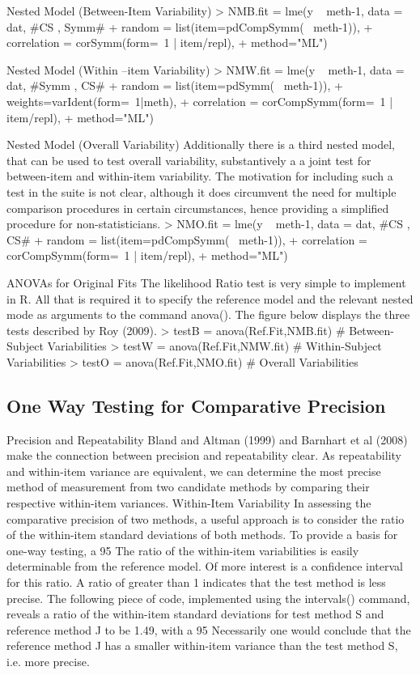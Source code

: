 Nested Model (Between-Item Variability)
> NMB.fit  = lme(y ~ meth-1, data = dat,   #CS , Symm#
+     random = list(item=pdCompSymm(~ meth-1)),
+     correlation = corSymm(form=~1 | item/repl), 
+     method="ML")


Nested Model (Within –item Variability)
> NMW.fit = lme(y ~ meth-1, data = dat,   #Symm , CS# 
+     random = list(item=pdSymm(~ meth-1)),
+     weights=varIdent(form=~1|meth), 
+     correlation = corCompSymm(form=~1 | item/repl), 
+     method="ML")


Nested Model (Overall Variability)
Additionally there is a third nested model, that can be used to test overall variability, substantively a a joint test for between-item and within-item variability. The motivation for including such a test in the suite is not clear, although it does circumvent the need for multiple comparison procedures in certain circumstances, hence providing a simplified procedure for non-statisticians.
> NMO.fit = lme(y ~ meth-1, data = dat,   #CS , CS# 
+     random = list(item=pdCompSymm(~ meth-1)), 
+     correlation = corCompSymm(form=~1 | item/repl), 
+     method="ML")


ANOVAs  for  Original Fits
The likelihood Ratio test is very simple to implement in R. All that is required it to specify the reference model and the relevant nested mode as arguments to the command anova().
The figure below displays the three tests described by Roy (2009).
> testB    = anova(Ref.Fit,NMB.fit)                          # Between-Subject Variabilities
> testW   = anova(Ref.Fit,NMW.fit)                        # Within-Subject Variabilities
> testO     = anova(Ref.Fit,NMO.fit)                        # Overall Variabilities



\subsection*{One Way Testing for Comparative Precision}

Precision and Repeatability
Bland and Altman (1999) and Barnhart et al (2008) make the connection between precision and repeatability clear. As repeatability and within-item variance are equivalent, we can determine the most precise method of measurement from two candidate methods by comparing their respective within-item variances.
Within-Item Variability
In assessing the comparative precision of two methods, a useful approach is to consider the ratio of the within-item standard deviations of both methods.
To provide a basis for one-way testing, a 95%
The ratio of the within-item variabilities is easily determinable from the reference model. Of more interest is a confidence interval for this ratio. A ratio of greater than 1 indicates that the test method is less precise.
The following piece of code, implemented using the intervals() command,  reveals a ratio of the within-item standard deviations for test method S and reference method J to be 1.49, with a 95%
Necessarily one would conclude that the reference method J has a smaller within-item variance than the test method S, i.e. more precise.

